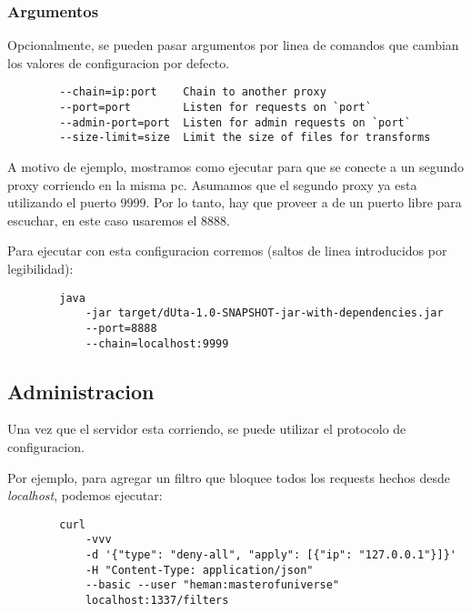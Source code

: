\documentclass[11pt,a4paper,titlepage]{article}
\begin{document}
    \subsubsection{Argumentos}
    Opcionalmente, se pueden pasar argumentos por linea de comandos que cambian los valores de configuracion por defecto.
    \begin{verbatim}
        --chain=ip:port    Chain to another proxy
        --port=port        Listen for requests on `port`
        --admin-port=port  Listen for admin requests on `port`
        --size-limit=size  Limit the size of files for transforms
    \end{verbatim}

    A motivo de ejemplo, mostramos como ejecutar \duta para que se conecte a un segundo proxy corriendo en la misma pc.
    Asumamos que el segundo proxy ya esta utilizando el puerto 9999.
    Por lo tanto, hay que proveer a \duta de un puerto libre para escuchar, en este caso usaremos el 8888.

    Para ejecutar con esta configuracion corremos (saltos de linea introducidos por legibilidad):
    \begin{verbatim}
        java
            -jar target/dUta-1.0-SNAPSHOT-jar-with-dependencies.jar
            --port=8888
            --chain=localhost:9999
    \end{verbatim}

    \subsection{Administracion}
    Una vez que el servidor esta corriendo, se puede utilizar el protocolo de configuracion.

    Por ejemplo, para agregar un filtro que bloquee todos los requests hechos desde \textit{localhost}, podemos ejecutar:
    \begin{verbatim}
        curl
            -vvv
            -d '{"type": "deny-all", "apply": [{"ip": "127.0.0.1"}]}'
            -H "Content-Type: application/json"
            --basic --user "heman:masterofuniverse"
            localhost:1337/filters
    \end{verbatim}


\end{document}
